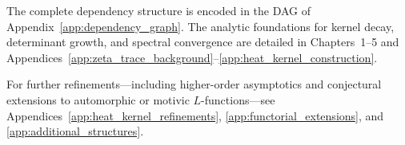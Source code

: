 \medskip

\noindent
The complete dependency structure is encoded in the DAG of Appendix~\ref{app:dependency_graph}. The analytic foundations for kernel decay, determinant growth, and spectral convergence are detailed in Chapters~1–5 and Appendices~\ref{app:zeta_trace_background}–\ref{app:heat_kernel_construction}.

\medskip

\noindent
For further refinements—including higher-order asymptotics and conjectural extensions to automorphic or motivic \( L \)-functions—see Appendices~\ref{app:heat_kernel_refinements}, \ref{app:functorial_extensions}, and \ref{app:additional_structures}.
